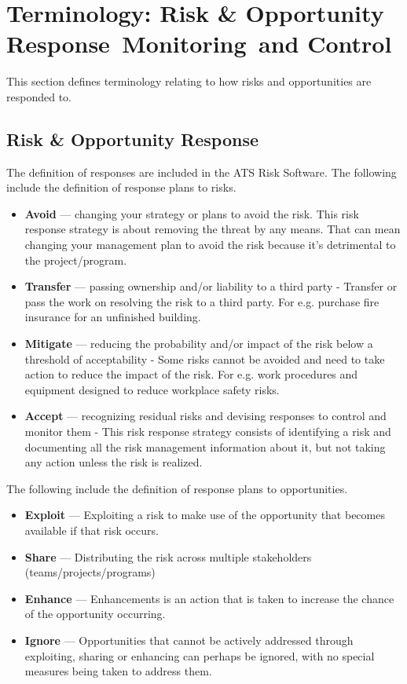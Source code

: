\section{Terminology: Risk \& Opportunity Response\, Monitoring\, and Control}

This section defines terminology relating to how risks and opportunities are responded to.

\subsection{Risk \& Opportunity Response}
\label{sec:response-types}

The definition of responses are included in the ATS Risk Software.
The following include the definition of response plans to risks.

\begin{itemize}
	\item \textbf{Avoid} ---
	changing your strategy or plans to avoid the risk. This risk response strategy is about removing the threat by any means. That can mean changing your management plan to avoid the risk because it’s detrimental to the project/program.

	\item \textbf{Transfer} ---
	passing ownership and/or liability to a third party - Transfer or pass the work on resolving the risk to a third party. For e.g. purchase fire insurance for an unfinished building.

	\item \textbf{Mitigate} ---
	reducing the probability and/or impact of the risk below a threshold of acceptability - Some risks cannot be avoided and need to take action to reduce the impact of the risk. For e.g. work procedures and equipment designed to reduce workplace safety risks.

	\item \textbf{Accept} ---
	recognizing residual risks and devising responses to control and monitor them - This risk response strategy consists of identifying a risk and documenting all the risk management information about it, but not taking any action unless the risk is realized.
\end{itemize}

The following include the definition of response plans to opportunities.

\begin{itemize}
	\item \textbf{Exploit} ---
	Exploiting a risk to make use of the opportunity that becomes available if that risk occurs.

	\item \textbf{Share} ---
	Distributing the risk across multiple stakeholders (teams/projects/programs)

	\item \textbf{Enhance} ---
	Enhancements is an action that is taken to increase the chance of the opportunity occurring.

	\item \textbf{Ignore} ---
	Opportunities that cannot be actively addressed through exploiting, sharing or enhancing can perhaps be ignored, with no special measures being taken to address them.
\end{itemize}
